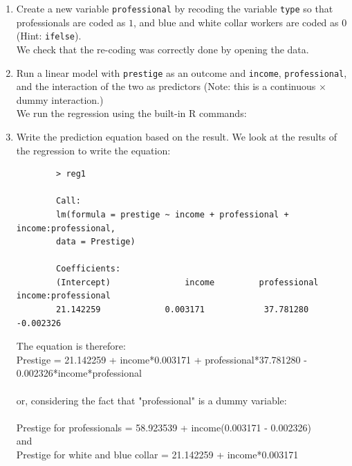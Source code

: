 \documentclass[12pt,letterpaper]{article}
\begin{document}
\newpage
\begin{enumerate}
	
	\item [(a)]
	Create a new variable \texttt{professional} by recoding the variable \texttt{type} so that professionals are coded as $1$, and blue and white collar workers are coded as $0$ (Hint: \texttt{ifelse}). \\
	
	
	
	We check that the re-coding was correctly done by opening the data.
	
	
	\vspace{1cm}
	
	
	\item [(b)]
	Run a linear model with \texttt{prestige} as an outcome and \texttt{income}, \texttt{professional}, and the interaction of the two as predictors (Note: this is a continuous $\times$ dummy interaction.) \\
	We run the regression using the built-in R commands:
	
	
	\vspace{1cm}
	\item [(c)]
	Write the prediction equation based on the result.
	We look at the results of the regression to write the equation: \\
		\begin{verbatim}
		> reg1
		
		Call:
		lm(formula = prestige ~ income + professional + income:professional, 
		data = Prestige)
		
		Coefficients:
		(Intercept)               income         professional  income:professional  
		21.142259             0.003171            37.781280            -0.002326
	\end{verbatim}
	The equation is therefore: \\
	Prestige = 21.142259 + income*0.003171 + professional*37.781280 - 0.002326*income*professional \\
	\vspace{.5cm} \\
	or, considering the fact that "professional" is a dummy variable: \\
	\vspace{.5cm} \\
	Prestige for professionals = 58.923539  + income(0.003171 - 0.002326) \\
	and\\
	Prestige for white and blue collar = 21.142259 + income*0.003171
	

\end{enumerate}
\end{document}
